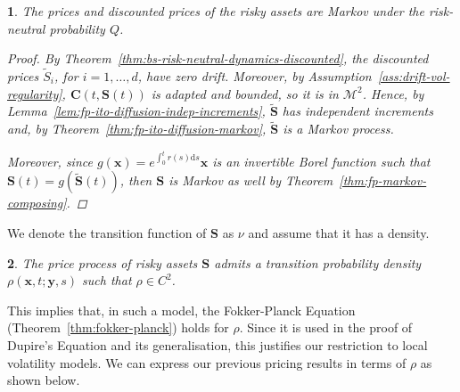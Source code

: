 \documentclass[english]{article}
\numberwithin{equation}{section}
\numberwithin{figure}{section}
\theoremstyle{bolddescit}
\newtheorem{theorem}{\protect\theoremname}[section]
\theoremstyle{definition}
\theoremstyle{definition}
\theoremstyle{plain}
\theoremstyle{plain}
\theoremstyle{bolddesc}
\newtheorem{assumption}[theorem]{\protect\assumptionname}
\theoremstyle{plain}
\theoremstyle{remark}
\providecommand{\assumptionname}{Assumption}
\providecommand{\theoremname}{Theorem}
\begin{document}
\begin{theorem}\label{thm:local-stock-prices-markov}
  The prices and discounted prices of the risky assets are Markov under the risk-neutral probability $Q$.

  \begin{proof}
    By Theorem~\ref{thm:bs-risk-neutral-dynamics-discounted}, the discounted prices $\widetilde{S}_i$, for $i=1,\ldots,d$, have zero drift. Moreover, by Assumption~\ref{ass:drift-vol-regularity}, $\mathbf{C}(t,\mathbf{S}(t))$ is adapted and bounded, so it is in $\mathcal{M}^2$. Hence, by Lemma~\ref{lem:fp-ito-diffusion-indep-increments}, $\widetilde{\mathbf{S}}$ has independent increments and, by Theorem~\ref{thm:fp-ito-diffusion-markov}, $\widetilde{\mathbf{S}}$ is a Markov process.

    Moreover, since $g(\mathbf{x}) = e^{\int_0^t r(s) \mathrm{d}s} \mathbf{x}$ is an invertible Borel function such that $\mathbf{S}(t) = g(\widetilde{\mathbf{S}}(t))$, then $\mathbf{S}$ is Markov as well by Theorem~\ref{thm:fp-markov-composing}.
  \end{proof}
\end{theorem}

We denote the transition function of $\mathbf{S}$ as $\nu$ and assume that it has a density.

\begin{assumption}\label{ass:local-density}
  The price process of risky assets $\mathbf{S}$ admits a transition probability density $\rho(\mathbf{x},t;\mathbf{y},s)$ such that $\rho \in C^2$.
\end{assumption}

This implies that, in such a model, the Fokker-Planck Equation (Theorem~\ref{thm:fokker-planck}) holds for $\rho$. Since it is used in the proof of Dupire's Equation and its generalisation, this justifies our restriction to local volatility models. We can express our previous pricing results in terms of $\rho$ as shown below.
\end{document}
